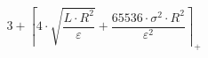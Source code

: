 \[3 + \left\lceil 4 \cdot \sqrt{\frac{L \cdot R^{2}}{\varepsilon}} + \frac{65536 \cdot \sigma^{2} \cdot R^{2}}{\varepsilon^{2}} \right\rceil_{+}\]
